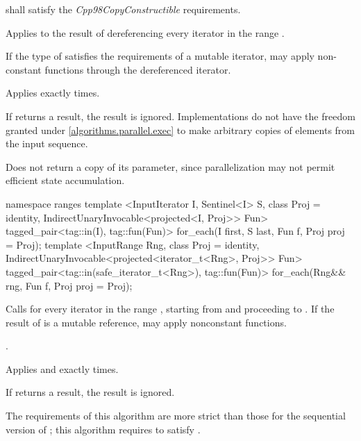 \begin{itemdescr}
\pnum
\requires
{} shall satisfy the \textit{Cpp98CopyConstructible} requirements.

\pnum
\effects
Applies  to the result of dereferencing every iterator in the range
.
\begin{note}
If the type of  satisfies the requirements of a mutable iterator,
 may apply non-constant functions through the dereferenced iterator.
\end{note}

\pnum
\complexity
Applies  exactly  times.

\pnum
\remarks
If  returns a result, the result is ignored.
Implementations do not
have the freedom granted under \ref{algorithms.parallel.exec} to make arbitrary
copies of elements from the input sequence.

\pnum
\begin{note}
Does not return a copy of its  parameter, since
parallelization may not permit efficient state accumulation.
\end{note}
\end{itemdescr}

\begin{addedblock}
%
\begin{itemdecl}
namespace ranges {
  template <InputIterator I, Sentinel<I> S, class Proj = identity,
            IndirectUnaryInvocable<projected<I, Proj>> Fun>
    tagged_pair<tag::in(I), tag::fun(Fun)>
      for_each(I first, S last, Fun f, Proj proj = Proj{});
  template <InputRange Rng, class Proj = identity,
            IndirectUnaryInvocable<projected<iterator_t<Rng>, Proj>> Fun>
    tagged_pair<tag::in(safe_iterator_t<Rng>), tag::fun(Fun)>
      for_each(Rng&& rng, Fun f, Proj proj = Proj{});
}
\end{itemdecl}

\begin{itemdescr}
\pnum
\effects
Calls
 for every iterator
 in the range
,
starting from
and proceeding to
.
\enternote If the result of
 is a mutable reference,  may apply
nonconstant functions.\exitnote

\pnum
\returns
{}.

\pnum
\complexity
Applies  and 
exactly
times.

\pnum
\remarks
If  returns a result, the result is ignored.

\pnum
\enternote The requirements of this algorithm are more strict than those
for the sequential version of ; this algorithm requires
 to satisfy . \exitnote
\end{itemdescr}
\end{addedblock}

